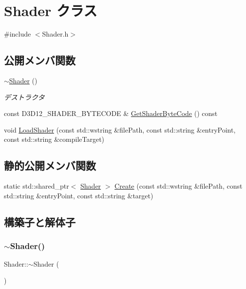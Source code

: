 \hypertarget{class_shader}{}\section{Shader クラス}
\label{class_shader}


{\ttfamily \#include $<$Shader.\+h$>$}

\subsection*{公開メンバ関数}
\begin{DoxyCompactItemize}
\item 
\mbox{\hyperlink{class_shader_aff01df87e8a102f270b5b135a295e59d}{$\sim$\+Shader}} ()
\begin{DoxyCompactList}\small\item\em デストラクタ \end{DoxyCompactList}\item 
const D3\+D12\+\_\+\+S\+H\+A\+D\+E\+R\+\_\+\+B\+Y\+T\+E\+C\+O\+DE \& \mbox{\hyperlink{class_shader_a96c9bed91ff649b8e8e3616298a5b9fd}{Get\+Shader\+Byte\+Code}} () const
\item 
void \mbox{\hyperlink{class_shader_ae290b5ecab7217ee98491263adab5247}{Load\+Shader}} (const std\+::wstring \&file\+Path, const std\+::string \&entry\+Point, const std\+::string \&compile\+Target)
\end{DoxyCompactItemize}
\subsection*{静的公開メンバ関数}
\begin{DoxyCompactItemize}
\item 
static std\+::shared\+\_\+ptr$<$ \mbox{\hyperlink{class_shader}{Shader}} $>$ \mbox{\hyperlink{class_shader_a2f0d0fc9c902917fb0f8d726fa4f49f3}{Create}} (const std\+::wstring \&file\+Path, const std\+::string \&entry\+Point, const std\+::string \&target)
\end{DoxyCompactItemize}


\subsection{構築子と解体子}
\mbox{\label{class_shader_aff01df87e8a102f270b5b135a295e59d}} 
\subsubsection{\texorpdfstring{$\sim$\+Shader()}{~Shader()}}
{\footnotesize\ttfamily Shader\+::$\sim$\+Shader (\begin{DoxyParamCaption}{ }\end{DoxyParamCaption})}



